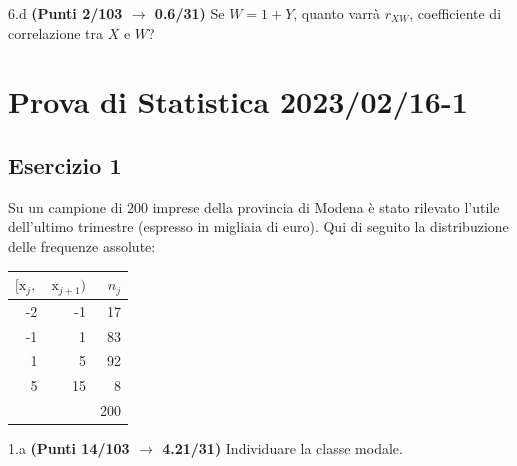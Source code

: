 \documentclass[
  11pt,
]{book}
\theoremstyle{mytheoremstyle}
\theoremstyle{mydefstyle}
\begin{document}
6.d \textbf{(Punti 2/103 \(\rightarrow\) 0.6/31)} Se \(W=1+ Y\), quanto varrà \(r_{XW}\), coefficiente di correlazione tra \(X\) e \(W\)?

\section{Prova di Statistica 2023/02/16-1}\label{prova-di-statistica-20230216-1}

\subsection{Esercizio 1}\label{esercizio-1-23}

Su un campione di \(200\) imprese della provincia di Modena è stato rilevato l'utile dell'ultimo trimestre (espresso in migliaia di euro). Qui di seguito la distribuzione delle frequenze assolute:

\begin{table}[H]
\centering
\begin{tabular}{rrr}
\toprule
$[\text{x}_j,$ & $\text{x}_{j+1})$ & $n_j$\\
\midrule
-2 & -1 & 17\\
-1 & 1 & 83\\
1 & 5 & 92\\
5 & 15 & 8\\
 &  & 200\\
\bottomrule
\end{tabular}
\end{table}

1.a \textbf{(Punti 14/103 \(\rightarrow\) 4.21/31)} Individuare la classe modale.
\end{document}
